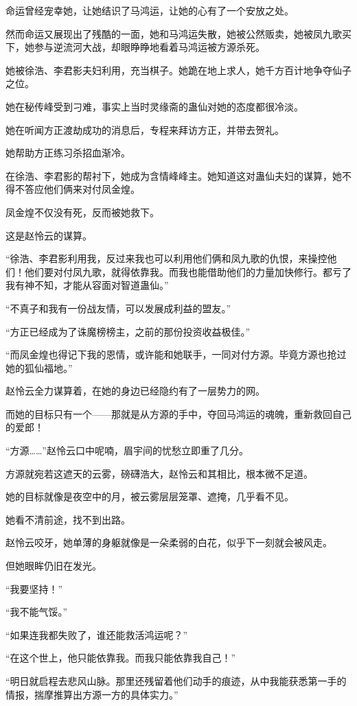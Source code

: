\begin{this_body}
命运曾经宠幸她，让她结识了马鸿运，让她的心有了一个安放之处。

然而命运又展现出了残酷的一面，她和马鸿运失散，她被公然贩卖，她被凤九歌买下，她参与逆流河大战，却眼睁睁地看着马鸿运被方源杀死。

她被徐浩、李君影夫妇利用，充当棋子。她跪在地上求人，她千方百计地争夺仙子之位。

她在秘传峰受到刁难，事实上当时灵缘斋的蛊仙对她的态度都很冷淡。

她在听闻方正渡劫成功的消息后，专程来拜访方正，并带去贺礼。

她帮助方正练习杀招血渐冷。

在徐浩、李君影的帮衬下，她成为含情峰峰主。她知道这对蛊仙夫妇的谋算，她不得不答应他们俩来对付凤金煌。

凤金煌不仅没有死，反而被她救下。

这是赵怜云的谋算。

“徐浩、李君影利用我，反过来我也可以利用他们俩和凤九歌的仇恨，来操控他们！他们要对付凤九歌，就得依靠我。而我也能借助他们的力量加快修行。都亏了我有神不知，才能从容面对智道蛊仙。”

“不真子和我有一份战友情，可以发展成利益的盟友。”

“方正已经成为了诛魔榜榜主，之前的那份投资收益极佳。”

“而凤金煌也得记下我的恩情，或许能和她联手，一同对付方源。毕竟方源也抢过她的狐仙福地。”

赵怜云全力谋算着，在她的身边已经隐约有了一层势力的网。

而她的目标只有一个——那就是从方源的手中，夺回马鸿运的魂魄，重新救回自己的爱郎！

“方源……”赵怜云口中呢喃，眉宇间的忧愁立即重了几分。

方源就宛若这遮天的云雾，磅礴浩大，赵怜云和其相比，根本微不足道。

她的目标就像是夜空中的月，被云雾层层笼罩、遮掩，几乎看不见。

她看不清前途，找不到出路。

赵怜云咬牙，她单薄的身躯就像是一朵柔弱的白花，似乎下一刻就会被风走。

但她眼眸仍旧在发光。

“我要坚持！”

“我不能气馁。”

“如果连我都失败了，谁还能救活鸿运呢？”

“在这个世上，他只能依靠我。而我只能依靠我自己！”

“明日就启程去悲风山脉。那里还残留着他们动手的痕迹，从中我能获悉第一手的情报，揣摩推算出方源一方的具体实力。”

\end{this_body}

